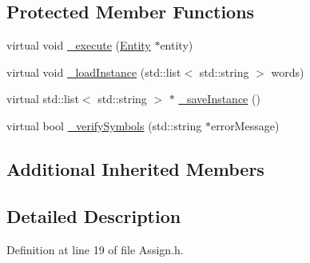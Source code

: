 \subsection*{Protected Member Functions}
\begin{DoxyCompactItemize}
\item 
virtual void \hyperlink{class_assign_a5fabf69268b2e65d8b01ce247be87a40}{\-\_\-execute} (\hyperlink{class_entity}{Entity} $\ast$entity)
\item 
virtual void \hyperlink{class_assign_a95e3169a6ae13ef3dc6dd9f0dde16c30}{\-\_\-load\-Instance} (std\-::list$<$ std\-::string $>$ words)
\item 
virtual std\-::list$<$ std\-::string $>$ $\ast$ \hyperlink{class_assign_a8b38a0a1bec283f5d2f44f67be5a4a6b}{\-\_\-save\-Instance} ()
\item 
virtual bool \hyperlink{class_assign_a5f3a7d8a7214574fea926cae1b1acb94}{\-\_\-verify\-Symbols} (std\-::string $\ast$error\-Message)
\end{DoxyCompactItemize}
\subsection*{Additional Inherited Members}


\subsection{Detailed Description}


Definition at line 19 of file Assign.\-h.



